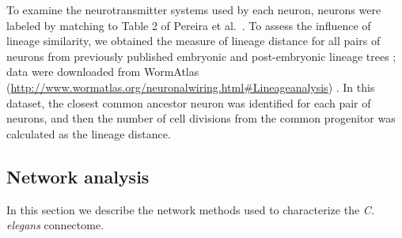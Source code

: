 \documentclass[10pt,letterpaper]{article}
\begin{document}
To examine the neurotransmitter systems used by each neuron, neurons were labeled by matching to Table 2 of Pereira et al.~\cite{Pereira:2015er}.
To assess the influence of lineage similarity, we obtained the measure of lineage distance for all pairs of neurons from previously published embryonic and post-embryonic lineage trees \cite{Sulston1977, Sulston1983}; data were downloaded from WormAtlas (\url{http://www.wormatlas.org/neuronalwiring.html#Lineageanalysis}) \cite{WormAtlas}.
In this dataset, the closest common ancestor neuron was identified for each pair of neurons, and then the number of cell divisions from the common progenitor was calculated as the lineage distance.

\subsection*{Network analysis}
In this section we describe the network methods used to characterize the \emph{C. elegans} connectome.
\end{document}
